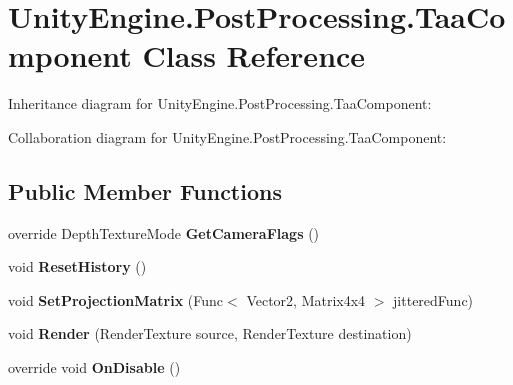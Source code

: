 \hypertarget{class_unity_engine_1_1_post_processing_1_1_taa_component}{}\section{Unity\+Engine.\+Post\+Processing.\+Taa\+Component Class Reference}
\label{class_unity_engine_1_1_post_processing_1_1_taa_component}


Inheritance diagram for Unity\+Engine.\+Post\+Processing.\+Taa\+Component\+:


Collaboration diagram for Unity\+Engine.\+Post\+Processing.\+Taa\+Component\+:
\subsection*{Public Member Functions}
\begin{DoxyCompactItemize}
\item 
\mbox{\label{class_unity_engine_1_1_post_processing_1_1_taa_component_acdb6cc8b86f8792042c7d57579db1e4a}} 
override Depth\+Texture\+Mode {\bfseries Get\+Camera\+Flags} ()
\item 
\mbox{\label{class_unity_engine_1_1_post_processing_1_1_taa_component_a338933e1af86c58cfcd016994651b5d8}} 
void {\bfseries Reset\+History} ()
\item 
\mbox{\label{class_unity_engine_1_1_post_processing_1_1_taa_component_ac388a6ff1c2b47604772d4a18e6e8d24}} 
void {\bfseries Set\+Projection\+Matrix} (Func$<$ Vector2, Matrix4x4 $>$ jittered\+Func)
\item 
\mbox{\label{class_unity_engine_1_1_post_processing_1_1_taa_component_a84a55cff0051067183e6e2daa8cfe317}} 
void {\bfseries Render} (Render\+Texture source, Render\+Texture destination)
\item 
\mbox{\label{class_unity_engine_1_1_post_processing_1_1_taa_component_aae1a9b2df8e23593b75e7eb2c9cc6b4c}} 
override void {\bfseries On\+Disable} ()
\end{DoxyCompactItemize}
